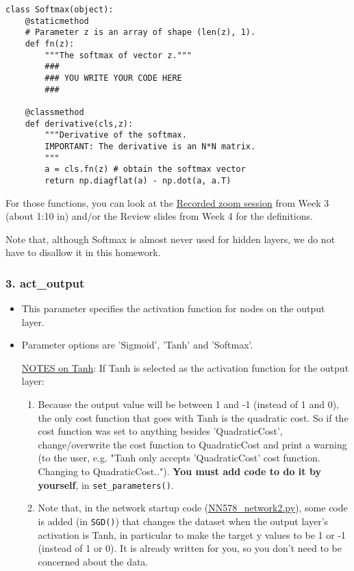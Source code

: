 \documentclass[11pt]{article}
\begin{document}
\begin{itemize}
\begin{verbatim}
class Softmax(object):
    @staticmethod
    # Parameter z is an array of shape (len(z), 1).
    def fn(z):
        """The softmax of vector z."""
        ###
        ### YOU WRITE YOUR CODE HERE
        ###

    @classmethod
    def derivative(cls,z):
        """Derivative of the softmax.  
        IMPORTANT: The derivative is an N*N matrix.
        """
        a = cls.fn(z) # obtain the softmax vector
        return np.diagflat(a) - np.dot(a, a.T)
\end{verbatim}

For those functions, you can look at the \href{https://depaul.zoom.us/rec/play/-9zBvchXodIQ6F1wN-eVXaAyOZpdjHMcA\_4BT6tPrXkkqEQb9frddpOd8p0FfTy7Zl5l4Zj8foa3Gp2O.cwaBIuqKYIq9Kojv?continueMode=true\&\_x\_zm\_rtaid=0hXVYogNTWeL\_9zcHvWxRA.1603064569512.dec1409ec0c39f5fdf363070d27a6cee\&\_x\_zm\_rhtaid=174}{Recorded zoom session} from Week 3 (about 1:10 in) and/or the Review slides from Week 4 for the definitions.

Note that, although Softmax is almost never used for hidden layers, we do not have to disallow it in this homework.
\end{itemize}

\subsubsection*{3. act\_output}
\label{sec:org62ec159}
\begin{itemize}
\item This parameter specifies the activation function for nodes on the output layer.
\item Parameter options are 'Sigmoid', 'Tanh' and 'Softmax'. 

\uline{NOTES on Tanh}:  If Tanh is selected as the activation function for the output layer:
\begin{enumerate}
\item Because the output value will be between 1 and -1 (instead of 1 and 0), the only cost function that goes with Tanh is the quadratic cost.  So if the cost function was set to anything besides 'QuadraticCost', change/overwrite the cost function to QuadraticCost and print a warning (to the user, e.g. "Tanh only accepts 'QuadraticCost' cost function.  Changing to QuadraticCost..").  \textbf{You must add code to do it by yourself}, in \texttt{set\_parameters()}.

\item Note that, in the network startup code (\href{./NN578\_network2.py}{NN578\_network2.py}), some code is added (in \texttt{SGD()}) that changes the dataset when the output layer's activation is Tanh, in particular to make the target y values to be 1 or -1 (instead of 1 or 0).  It is already written for you, so you don't need to be concerned about the data.
\end{enumerate}
\end{itemize}
\end{document}
